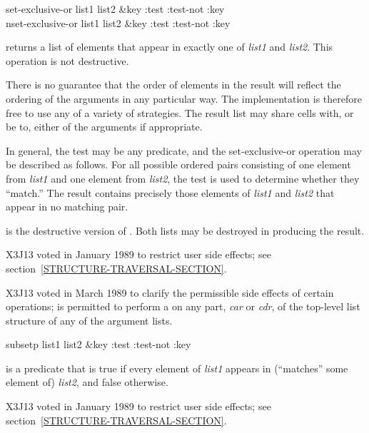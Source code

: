 \begin{defun}[Function]
set-exclusive-or list1 list2 &key :test :test-not :key \\
nset-exclusive-or list1 list2 &key :test :test-not :key

 returns a list of elements that appear
in exactly one of {\it list1} and {\it list2}.
This operation is not destructive.

There is no guarantee that the order of elements in the result will
reflect the ordering of the arguments in any particular way.
The implementation is therefore free to use any of a variety of strategies.
The result list may share cells with, or be  to, either of the arguments
if appropriate.

In general, the test may be any predicate, and the set-exclusive-or operation
may be described as follows.  For all possible ordered pairs consisting of
one element from {\it list1} and one element from {\it list2}, the test is
used to determine whether they ``match.''  The result contains precisely
those elements of {\it list1} and {\it list2} that appear in no matching pair.

\newpage%

 is the destructive version of .
Both lists may be destroyed in producing the result.

\begin{new}
X3J13 voted in January 1989
to restrict user side effects; see section~\ref{STRUCTURE-TRAVERSAL-SECTION}.
\end{new}

\begin{newer}
X3J13 voted in March 1989 
to clarify the permissible side effects of certain operations;
 is permitted to perform a  on any part,
{\it car} or {\it cdr}, of the top-level list structure of 
any of the argument lists.
\end{newer}
\end{defun}

\begin{defun}[Function]
subsetp list1 list2 &key :test :test-not :key

 is a predicate that is true if every element of {\it list1}
appears in (``matches'' some element of) {\it list2}, and false otherwise.

\begin{new}
X3J13 voted in January 1989
to restrict user side effects; see section~\ref{STRUCTURE-TRAVERSAL-SECTION}.
\end{new}
\end{defun}


